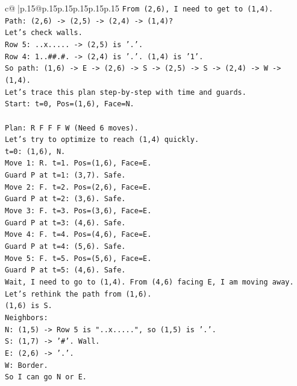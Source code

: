 \documentclass{article}
\begin{document}
{\begin{supertabular}{c@{$\;$}|p{.15\linewidth}@{}p{.15\linewidth}p{.15\linewidth}p{.15\linewidth}p{.15\linewidth}p{.15\linewidth}}
{{{\texttt{From (2,6), I need to get to (1,4).} \\
\texttt{Path: (2,6) {-}> (2,5) {-}> (2,4) {-}> (1,4)?} \\
\texttt{Let's check walls.} \\
\texttt{Row 5: ..x..... {-}> (2,5) is '.'.} \\
\texttt{Row 4: 1..\#\#.\#. {-}> (2,4) is '.'. (1,4) is '1'.} \\
\texttt{So path: (1,6) {-}> E {-}> (2,6) {-}> S {-}> (2,5) {-}> S {-}> (2,4) {-}> W {-}> (1,4).} \\
\texttt{Let's trace this plan step{-}by{-}step with time and guards.} \\
\texttt{Start: t=0, Pos=(1,6), Face=N.} \\
\\ 
\texttt{Plan: R F F F W (Need 6 moves).} \\
\texttt{Let's try to optimize to reach (1,4) quickly.} \\
\texttt{t=0: (1,6), N.} \\
\texttt{Move 1: R. t=1. Pos=(1,6), Face=E.} \\
\texttt{Guard P at t=1: (3,7). Safe.} \\
\texttt{Move 2: F. t=2. Pos=(2,6), Face=E.} \\
\texttt{Guard P at t=2: (3,6). Safe.} \\
\texttt{Move 3: F. t=3. Pos=(3,6), Face=E.} \\
\texttt{Guard P at t=3: (4,6). Safe.} \\
\texttt{Move 4: F. t=4. Pos=(4,6), Face=E.} \\
\texttt{Guard P at t=4: (5,6). Safe.} \\
\texttt{Move 5: F. t=5. Pos=(5,6), Face=E.} \\
\texttt{Guard P at t=5: (4,6). Safe.} \\
\texttt{Wait, I need to go to (1,4). From (4,6) facing E, I am moving away.} \\
\texttt{Let's rethink the path from (1,6).} \\
\texttt{(1,6) is S.} \\
\texttt{Neighbors:} \\
\texttt{N: (1,5) {-}> Row 5 is "..x.....", so (1,5) is '.'.} \\
\texttt{S: (1,7) {-}> '\#'. Wall.} \\
\texttt{E: (2,6) {-}> '.'.} \\
\texttt{W: Border.} \\
\texttt{So I can go N or E.} \\
}}}
\end{supertabular}}
\end{document}
